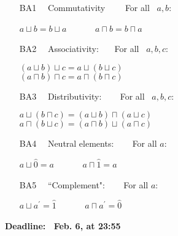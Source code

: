 \documentclass[fullapage,12pt]{article}
\begin{document}
\begin{itemize}
\item [{BA1}] ~~Commutativity~~~~ For all~  $a, b$:
\begin{center}
$a \sqcup b = b \sqcup a$~~~~~~ $a \sqcap b = b \sqcap a$
\end{center}

\item [{BA2}] ~~Associativity:~~~ For all~  $a, b, c$:
\begin{center}
$(a \sqcup b) \sqcup c = a \sqcup (b \sqcup c)$\\ $(a
\sqcap b) \sqcap c = a \sqcap (b \sqcap c)$
\end{center}
\item [{BA3}] ~~Distributivity: ~~~ For all~  $a, b, c$:
\vspace{-2mm}\begin{center}
$a \sqcup ( b \sqcap c ) = (a \sqcup b) \sqcap (a \sqcup c )$\\
$a \sqcap ( b \sqcup c ) = (a \sqcap b) \sqcup (a \sqcap
c)$
\end{center}

\item [{BA4}] \ \ Neutral elements: ~~~ For all $a$: \vspace{-2mm}
\begin{center}
$a \sqcup \hat{0} = a$~~~~~~ $a \sqcap \hat{1} = a$
\end{center}

\item [{BA5}] ~~``Complement": ~~~ For all $a$: \vspace{-2mm}
\begin{center}
$a \sqcup  a^\prime = \hat{1}$~~~~~~ $a \sqcap  a^\prime =
\hat{0}$
\end{center}
\end{itemize}


{\bf Deadline: \ Feb. 6, at 23:55}
\end{document}
